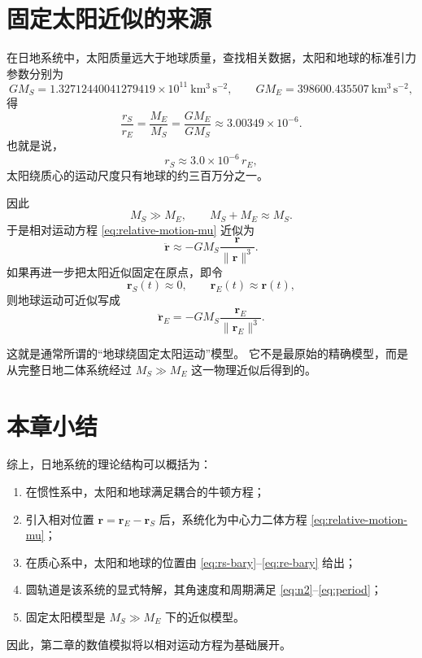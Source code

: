 \section{固定太阳近似的来源}

在日地系统中，太阳质量远大于地球质量，查找相关数据，太阳和地球的标准引力参数分别为\cite{JPLAstroParameters}
\[
GM_S=1.32712440041279419\times 10^{11}\ \mathrm{km^3\,s^{-2}},
\qquad
GM_E=398600.435507\ \mathrm{km^3\,s^{-2}},
\]
得
\[
\frac{r_S}{r_E}
=
\frac{M_E}{M_S}
=
\frac{GM_E}{GM_S}
\approx 3.00349\times 10^{-6}.
\]
也就是说，
\[
r_S \approx 3.0\times 10^{-6}\, r_E,
\]
太阳绕质心的运动尺度只有地球的约三百万分之一。

因此
\[
M_S\gg M_E,
\qquad
M_S+M_E\approx M_S.
\]
于是相对运动方程 \eqref{eq:relative-motion-mu} 近似为
\begin{equation}\label{eq:approx-relative}
\ddot{\bm r}\approx -GM_S\frac{\bm r}{\|\bm r\|^3}.
\end{equation}
如果再进一步把太阳近似固定在原点，即令
\[
\bm r_S(t)\approx 0,
\qquad
\bm r_E(t)\approx \bm r(t),
\]
则地球运动可近似写成
\begin{equation}\label{eq:earth-around-fixed-sun}
\ddot{\bm r}_E=-GM_S\frac{\bm r_E}{\|\bm r_E\|^3}.
\end{equation}

这就是通常所谓的“地球绕固定太阳运动”模型\cite{MurrayDermott1999,BateMuellerWhite1971}。
它不是最原始的精确模型，而是从完整日地二体系统经过 \(M_S\gg M_E\) 
这一物理近似后得到的。

\section{本章小结}

综上，日地系统的理论结构可以概括为：
\begin{enumerate}[label=\arabic*.]
  \item 在惯性系中，太阳和地球满足耦合的牛顿方程；
  \item 引入相对位置 \(\bm r=\bm r_E-\bm r_S\) 后，系统化为中心力二体方程 \eqref{eq:relative-motion-mu}；
  \item 在质心系中，太阳和地球的位置由 \eqref{eq:rs-bary}--\eqref{eq:re-bary} 给出；
  \item 圆轨道是该系统的显式特解，其角速度和周期满足 \eqref{eq:n2}--\eqref{eq:period}；
  \item 固定太阳模型是 \(M_S\gg M_E\) 下的近似模型。
\end{enumerate}

因此，第二章的数值模拟将以相对运动方程为基础展开。
